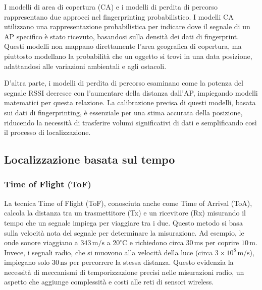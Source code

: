 I modelli di area di copertura (CA) e i modelli di perdita di percorso rappresentano due approcci nel fingerprinting probabilistico. I modelli CA utilizzano una rappresentazione probabilistica per indicare dove il segnale di un AP specifico è stato ricevuto, basandosi sulla densità dei dati di fingerprint. Questi modelli non mappano direttamente l'area geografica di copertura, ma piuttosto modellano la probabilità che un oggetto si trovi in una data posizione, adattandosi alle variazioni ambientali e agli ostacoli.

D'altra parte, i modelli di perdita di percorso esaminano come la potenza del segnale RSSI decresce con l'aumentare della distanza dall'AP, impiegando modelli matematici per questa relazione. La calibrazione precisa di questi modelli, basata sui dati di fingerprinting, è essenziale per una stima accurata della posizione, riducendo la necessità di trasferire volumi significativi di dati e semplificando così il processo di localizzazione.

\subsection{Localizzazione basata sul tempo}

\subsubsection{Time of Flight (ToF)}

\hspace{\parindent}La tecnica Time of Flight (ToF), conosciuta anche come Time of Arrival (ToA), calcola la distanza tra un trasmettitore (Tx) e un ricevitore (Rx) misurando il tempo che un segnale impiega per viaggiare tra i due. Questo metodo si basa sulla velocità nota del segnale per determinare la misurazione. Ad esempio, le onde sonore viaggiano a \(343 \, \text{m/s}\) a \(20^\circ \text{C}\) e richiedono circa \(30 \, \text{ms}\) per coprire \(10 \, \text{m}\). Invece, i segnali radio, che si muovono alla velocità della luce (circa \(3 \times 10^8 \, \text{m/s}\)), impiegano solo \(30 \, \text{ns}\) per percorrere la stessa distanza. Questo evidenzia la necessità di meccanismi di temporizzazione precisi nelle misurazioni radio, un aspetto che aggiunge complessità e costi alle reti di sensori wireless.

